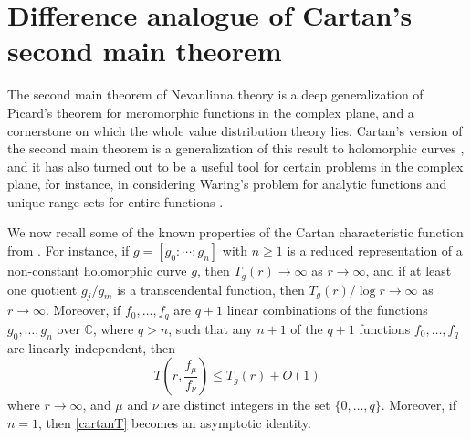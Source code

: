 \documentclass{amsart}
\newcommand{\C}{\mathbb{C}}
\theoremstyle{definition}
\numberwithin{equation}{section}
\numberwithin{theorem}{section}
\begin{document}
\section{Difference analogue of Cartan's second main theorem}\label{cartansec}

The second main theorem of Nevanlinna theory \cite{nevanlinna:25}
is a deep generalization of Picard's theorem for meromorphic
functions in the complex plane, and a cornerstone on which the
whole value distribution theory lies. Cartan's version of
the second main theorem \cite{cartan:33} is a generalization of this result  to holomorphic curves \cite{lang:87}, and it has also turned out to be a useful tool for certain problems in the complex plane, for instance, in considering Waring's problem for analytic functions \cite{hayman:84} and unique range sets for entire functions \cite{gundersen:03,gundersenh:04}.

We now recall some of the known properties of the Cartan
characteristic function from \cite{gundersenh:04,lang:87}. For
instance, if $g=[g_0:\cdots:g_n]$ with $n\geq 1$ is a reduced
representation of a non-constant holomorphic curve $g$, then $T_g(r)\to\infty$ as $r\to\infty$, and
if at least one quotient $g_j/g_m$ is a transcendental function,
then $T_g(r)/\log r\to\infty$ as $r\to\infty$. Moreover, if
$f_0,\ldots,f_q$ are $q+1$ linear combinations of the functions
$g_0,\ldots,g_n$ over $\C$, where $q>n$, such that any $n+1$ of
the $q+1$ functions $f_0,\ldots,f_q$ are linearly independent,
then
    \begin{equation}\label{cartanT}
    T\left(r,\frac{f_\mu}{f_\nu}\right)\leq T_g(r) + O(1)
    \end{equation}
where $r\to\infty$, and $\mu$ and $\nu$ are distinct integers in
the set $\{0,\ldots,q\}$. Moreover, if $n=1$, then \eqref{cartanT}
becomes an asymptotic identity.
\end{document}

